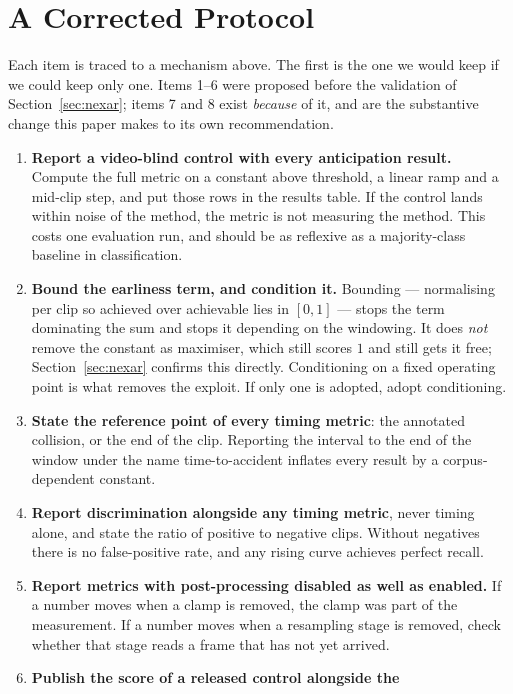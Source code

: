 \section{A Corrected Protocol}
\label{sec:protocol}

Each item is traced to a mechanism above. The first is the one we would keep if
we could keep only one. Items 1--6 were proposed before the validation of
Section~\ref{sec:nexar}; items 7 and 8 exist \emph{because} of it, and are the
substantive change this paper makes to its own recommendation.

\begin{enumerate}
\item \textbf{Report a video-blind control with every anticipation result.}
  Compute the full metric on a constant above threshold, a linear ramp and a
  mid-clip step, and put those rows in the results table. If the control lands
  within noise of the method, the metric is not measuring the method. This
  costs one evaluation run, and should be as reflexive as a majority-class
  baseline in classification.
\item \textbf{Bound the earliness term, and condition it.} Bounding ---
  normalising per clip so achieved over achievable lies in $[0,1]$ --- stops
  the term dominating the sum and stops it depending on the windowing. It does
  \emph{not} remove the constant as maximiser, which still scores $1$ and still
  gets it free; Section~\ref{sec:nexar} confirms this directly. Conditioning on
  a fixed operating point is what removes the exploit. If only one is adopted,
  adopt conditioning.
\item \textbf{State the reference point of every timing metric}: the annotated
  collision, or the end of the clip. Reporting the interval to the end of the
  window under the name time-to-accident inflates every result by a
  corpus-dependent constant.
\item \textbf{Report discrimination alongside any timing metric}, never timing
  alone, and state the ratio of positive to negative clips. Without negatives
  there is no false-positive rate, and any rising curve achieves perfect
  recall.
\item \textbf{Report metrics with post-processing disabled as well as
  enabled.} If a number moves when a clamp is removed, the clamp was part of
  the measurement. If a number moves when a resampling stage is removed, check
  whether that stage reads a frame that has not yet arrived.
\item \textbf{Publish the score of a released control alongside the
}
\end{enumerate}
